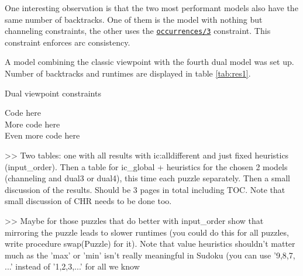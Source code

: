 One interesting observation is that the two most performant models also have the same number of backtracks. One of them is the model with nothing but channeling constraints, the other uses the \href{http://eclipseclp.org/doc/bips/lib/ic_global/occurrences-3.html}{\texttt{occurrences/3}} constraint. This constraint enforces arc consistency.\\\par

A model combining the classic viewpoint with the fourth dual model was set up. Number of backtracks and runtimes are displayed in table \ref{tab:res1}.

\begin{algorithm}[H]
\caption{Dual viewpoint constraints}\label{channeling}
\small
Code here\\
More code here\\
Even more code here
\end{algorithm}

>> Two tables: one with all results with ic:alldifferent and just fixed heuristics (input\_order). Then a table for ic\_global + heuristics for the chosen 2 models (channeling and dual3 or dual4), this time each puzzle separately. Then a small discussion of the results. Should be 3 pages in total including TOC. Note that small discussion of CHR needs to be done too.

>> Maybe for those puzzles that do better with input\_order show that mirroring the puzzle leads to slower runtimes (you could do this for all puzzles, write procedure swap(Puzzle) for it). Note that value heuristics shouldn't matter much as the 'max' or 'min' isn't  really meaningful in Sudoku (you can use '9,8,7, ...' instead of '1,2,3,...' for all we know

